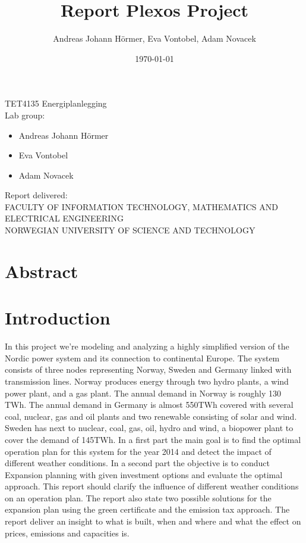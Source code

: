 \documentclass{article}
\title{Report Plexos Project}
\author{Andreas Johann H\"ormer, Eva Vontobel, Adam Novacek}
\date{\today}
\begin{document}
\thispagestyle{empty}
\maketitle
\thispagestyle{empty}
\begin{center}
TET4135 Energiplanlegging\\[3cm]
Lab group:
\begin{itemize}
\item Andreas Johann H\"ormer
\item Eva Vontobel
\item Adam Novacek\\[3cm]
\end{itemize}
Report delivered: \\[6cm]
FACULTY OF INFORMATION TECHNOLOGY, MATHEMATICS AND ELECTRICAL ENGINEERING\\
NORWEGIAN UNIVERSITY OF SCIENCE AND TECHNOLOGY
\end{center}
\thispagestyle{empty}
\newpage
\tableofcontents
\thispagestyle{empty}
\newpage
\section*{Abstract}
\thispagestyle{empty}

\newpage
\setcounter{page}{1}
\section{Introduction}
In this project we’re modeling and analyzing a highly simplified version of the Nordic power system and its connection to continental Europe. The system consists of three nodes representing Norway, Sweden and Germany linked with transmission lines. Norway produces energy through two hydro plants, a wind power plant, and a gas plant. The annual demand in Norway is roughly 130 TWh. The annual demand in Germany is almost 550TWh covered with several coal, nuclear, gas and oil plants and two renewable consisting of solar and wind. Sweden has next to nuclear, coal, gas, oil, hydro and wind, a biopower plant to cover the demand of 145TWh. In a first part the main goal is to find the optimal operation plan for this system for the year 2014 and detect the impact of different weather conditions. In a second part the objective is to conduct Expansion planning with given investment options and evaluate the optimal approach. This report should clarify the influence of different weather conditions on an operation plan. The report also state two possible solutions for the expansion plan using the green certificate and the emission tax approach. The report deliver an insight to what is built, when and where and what the effect on prices, emissions and capacities is.
\end{document}
